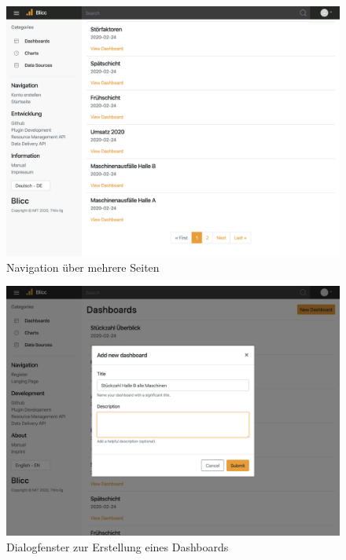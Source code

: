\begin{figure}[h]
    \centering
    \includegraphics[scale=0.35]{img/website/Pagination}
    \caption{Navigation über mehrere Seiten}
    \label{figure:navigationuebermehrereseiten}
\end{figure}

\begin{figure}[h]
    \centering
    \includegraphics[scale=0.35]{img/website/Modal}
    \caption{Dialogfenster zur Erstellung eines Dashboards}
    \label{figure:dialogfensterzurerstellungeinesdashboards}
\end{figure}
